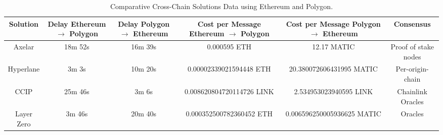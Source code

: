 \documentclass[fleqn,10pt]{olplainarticle}
\begin{document}
\begin{table}[H]
	\tiny
	\centering
	\begin{tabular}{|c|c|c|c|c|c|}
		\hline
		Solution  
		& \makecell{Delay\\ Ethereum $\longrightarrow$ Polygon}  
		& \makecell{Delay\\ Polygon $\longrightarrow$ Ethereum}
		& \makecell{Cost per Message\\ Ethereum $\longrightarrow$ Polygon}  
		& \makecell{Cost per Message\\ Polygon $\longrightarrow$ Ethereum}  
		& Consensus         \\ \hline
		
		Axelar    
		& 18m 52s \cite{noauthor_interchaintransfer_ETH_MATIC}                       
		& 16m 39s  \cite{noauthor_interchaintransfer_MATIC_ETH}         
		& 0.000595 ETH \cite{noauthor_interchaintransfer_ETH_MATIC}                  
		& 12.17 MATIC  \cite{noauthor_interchaintransfer_MATIC_ETH}             
		& Proof of stake nodes \\ \hline
		
		Hyperlane 
		& 3m 3s \cite{noauthor_hyperlane_ETH_MATIC}                     
		& 10m 20s \cite{noauthor_hyperlane_MATIC_ETH}    
		& 0.00002339021594448 ETH  \cite{noauthor_hyperlane_ETH_MATIC}           
		& 20.380072606431995 MATIC  \cite{noauthor_hyperlane_MATIC_ETH}            
		& Per-origin-chain \cite{hyperlane_validators_nodate}    \\ \hline
		
		CCIP      
		& 25m 46s \cite{ccip_ETH_MATIC}                          
		& 3m 6s\cite{ccip_MATIC_ETH}       
		& 0.008620804720114726 LINK \cite{ccip_ETH_MATIC}   
		& 2.534953023940595 LINK \cite{ccip_MATIC_ETH}
		& Chainlink Oracles \cite{chainlink_ccip_nodate} \\ \hline
		
		Layer Zero 
		& 3m 46s \cite{LZ_ETH_MATIC}                        
		& 20m 40s \cite{LZ_MATIC_ETH}    
		& 0.000352500782360452 ETH \cite{LZ_ETH_MATIC}          
		& 0.006596250005936625 MATIC \cite{LZ_MATIC_ETH}             
		& Oracles \cite{obasi_layerzero_2023}    \\ \hline
	\end{tabular}
	\caption{Comparative Cross-Chain Solutions Data using Ethereum and Polygon.}
	\label{tab:TableCrossChain}
\end{table}



\newpage

\end{document}
